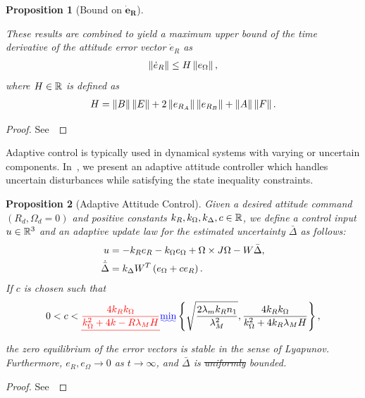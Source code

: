 \documentclass[10pt,fleqn]{IJCAS}  %
\newtheorem{prop}{Proposition}
\providecommand{\DIFadd}[1]{{\protect\color{blue}\uwave{#1}}} %
\providecommand{\DIFdel}[1]{{\protect\color{red}\sout{#1}}}                      %
\providecommand{\DIFaddbegin}{} %
\providecommand{\DIFaddend}{} %
\providecommand{\DIFdelbegin}{} %
\providecommand{\DIFdelend}{} %
\begin{document}
\begin{multicols}{2}
\begin{prop}[Bound on \( \bm{\dot{e}_R} \)]
\begin{enumerate}[(i)]
\DIFaddend \end{enumerate}
These results are combined to yield a maximum upper bound of the time derivative of the attitude error vector \( \dot{e}_R \) as
\begin{gather}
	\left\| \dot{e}_R \right\| \leq H \left\| e_\Omega \right\| ,\label{eqn:eR_bound}
\end{gather}
where  \( H \in \mathbb{R} \) is defined as
\begin{gather}
	H = \left\| B \right\| \left\| E \right\| + 2 \left\| e_{R_A} \right\| \left\| e_{R_B} \right\| + \left\| A \right\|\left\| F \right\|. \label{eqn:H}
\end{gather}
\end{prop}
\begin{proof}
See~
\end{proof}

Adaptive control is typically used in dynamical systems with varying or uncertain components.
In~, we present an adaptive attitude controller which handles uncertain disturbances while satisfying the state inequality constraints.

\begin{prop}[Adaptive Attitude Control]\label{prop:adaptive_control}
Given  a desired attitude command \( (R_d, \Omega_d = 0 )\) and positive constants \( k_R, k_\Omega, k_\Delta, c \in \mathbb{R} \), we define a control input \( u \in \mathbb{R}^3\) and an adaptive update law for the estimated uncertainty \( \bar{\Delta} \) as follows:
\begin{align}
	u &= - k_R e_R - k_\Omega e_\Omega + \Omega \times J \Omega - W \bar{\Delta} , \label{eqn:adaptive_control} \\
	\dot{\bar{\Delta}} &= k_\Delta W^T \left( e_\Omega + c e_R \right) . \label{eqn:delta_dot}
\end{align}
If \( c \) is chosen such that
\begin{gather}
	0 < c < \DIFdelbegin \DIFdel{\frac{4 k_R k_\Omega}{k_\Omega^2 + 4 k-R \lambda_M H} }\DIFdelend \DIFaddbegin \DIFadd{\min }\braces{\sqrt{\frac{2 \lambda_m k_R n_1}{\lambda_M^2}},
	\frac{4 k_R k_\Omega}{k_\Omega^2 + 4 k_R \lambda_M H}} \DIFaddend , \label{eqn:c_bound}
\end{gather}
  the zero equilibrium of the error vectors is stable in the sense of Lyapunov. Furthermore, $e_R,e_\Omega\rightarrow 0$ as $t\rightarrow\infty$, and $\bar\Delta$ is  \DIFdelbegin \DIFdel{uniformly }\DIFdelend bounded.
\end{prop}
\begin{proof}
See~
\end{proof}


\end{multicols}
\end{document}
